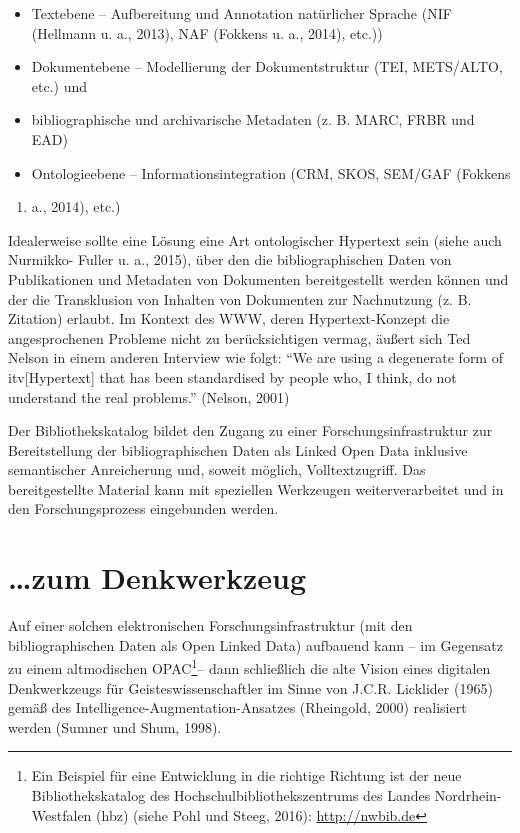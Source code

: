 \documentclass[a4paper,
fontsize=11pt,
oneside,
numbers=noperiodatend,
parskip=half-,
bibliography=totoc,
final
]{scrartcl}
\begin{document}
\begin{itemize}
\tightlist
\item
  Textebene -- Aufbereitung und Annotation natürlicher Sprache (NIF
  (Hellmann u. a., 2013), NAF (Fokkens u. a., 2014), etc.))
\item
  Dokumentebene -- Modellierung der Dokumentstruktur (TEI, METS/ALTO,
  etc.) und
\item
  bibliographische und archivarische Metadaten (z. B. MARC, FRBR und
  EAD)
\item
  Ontologieebene -- Informationsintegration (CRM, SKOS, SEM/GAF (Fokkens
\end{itemize}

\begin{enumerate}
\def\labelenumi{\alph{enumi}.}
\setcounter{enumi}{20}
\tightlist
\item
  a., 2014), etc.)
\end{enumerate}

Idealerweise sollte eine Lösung eine Art ontologischer Hypertext sein
(siehe auch Nurmikko- Fuller u. a., 2015), über den die
bibliographischen Daten von Publikationen und Metadaten von Dokumenten
bereitgestellt werden können und der die Transklusion von Inhalten von
Dokumenten zur Nachnutzung (z. B. Zitation) erlaubt. Im Kontext des WWW,
deren Hypertext-Konzept die angesprochenen Probleme nicht zu
berücksichtigen vermag, äußert sich Ted Nelson in einem anderen
Interview wie folgt: \enquote{We are using a degenerate form of
itv{[}Hypertext{]} that has been standardised by people who, I think, do
not understand the real problems.} (Nelson, 2001)

Der Bibliothekskatalog bildet den Zugang zu einer
Forschungsinfrastruktur zur Bereitstellung der bibliographischen Daten
als Linked Open Data inklusive semantischer Anreicherung und, soweit
möglich, Volltextzugriff. Das bereitgestellte Material kann mit
speziellen Werkzeugen weiterverarbeitet und in den Forschungsprozess
eingebunden werden.

\section*{\ldots{}zum Denkwerkzeug}\label{zum-denkwerkzeug}

Auf einer solchen elektronischen Forschungsinfrastruktur (mit den
bibliographischen Daten als Open Linked Data) aufbauend kann -- im
Gegensatz zu einem altmodischen OPAC\footnote{Ein Beispiel für eine
  Entwicklung in die richtige Richtung ist der neue Bibliothekskatalog
  des Hochschulbibliothekszentrums des Landes Nordrhein-Westfalen (hbz)
  (siehe Pohl und Steeg, 2016): \url{http://nwbib.de}}-- dann
schließlich die alte Vision eines digitalen Denkwerkzeugs für
Geisteswissenschaftler im Sinne von J.C.R. Licklider (1965) gemäß des
Intelligence-Augmentation-Ansatzes (Rheingold, 2000) realisiert werden
(Sumner und Shum, 1998).
\end{document}
